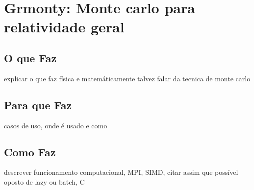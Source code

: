 \chapter{Grmonty: Monte carlo para relatividade geral}
\label{cap:grmonty}

\section{O que Faz}
  explicar o que faz física e matemáticamente
  talvez falar da tecnica de monte carlo
\section{Para que Faz}
  casos de uso, onde é usado e como

\section{Como Faz}
  descrever funcionamento computacional, MPI, SIMD, citar assim que possível oposto de lazy ou batch, C
